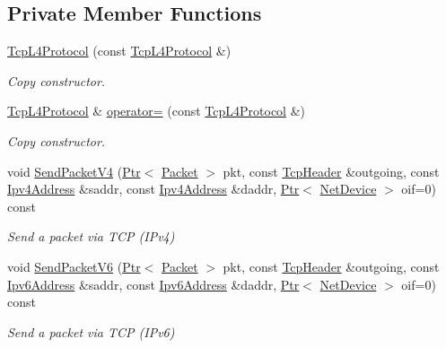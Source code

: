 \subsection*{Private Member Functions}
\begin{DoxyCompactItemize}
\item 
\hyperlink{classns3_1_1TcpL4Protocol_af48062ff2edb07fba859cfc9a863beaa}{Tcp\+L4\+Protocol} (const \hyperlink{classns3_1_1TcpL4Protocol}{Tcp\+L4\+Protocol} \&)
\begin{DoxyCompactList}\small\item\em Copy constructor. \end{DoxyCompactList}\item 
\hyperlink{classns3_1_1TcpL4Protocol}{Tcp\+L4\+Protocol} \& \hyperlink{classns3_1_1TcpL4Protocol_abe87d24c55bfbd6c6c2753725e239cca}{operator=} (const \hyperlink{classns3_1_1TcpL4Protocol}{Tcp\+L4\+Protocol} \&)
\begin{DoxyCompactList}\small\item\em Copy constructor. \end{DoxyCompactList}\item 
void \hyperlink{classns3_1_1TcpL4Protocol_ae57806dce4847383a27e329656e77e14}{Send\+Packet\+V4} (\hyperlink{classns3_1_1Ptr}{Ptr}$<$ \hyperlink{classns3_1_1Packet}{Packet} $>$ pkt, const \hyperlink{classns3_1_1TcpHeader}{Tcp\+Header} \&outgoing, const \hyperlink{classns3_1_1Ipv4Address}{Ipv4\+Address} \&saddr, const \hyperlink{classns3_1_1Ipv4Address}{Ipv4\+Address} \&daddr, \hyperlink{classns3_1_1Ptr}{Ptr}$<$ \hyperlink{classns3_1_1NetDevice}{Net\+Device} $>$ oif=0) const 
\begin{DoxyCompactList}\small\item\em Send a packet via T\+CP (I\+Pv4) \end{DoxyCompactList}\item 
void \hyperlink{classns3_1_1TcpL4Protocol_a12831eb88c02c37b3cf42cdda814cd19}{Send\+Packet\+V6} (\hyperlink{classns3_1_1Ptr}{Ptr}$<$ \hyperlink{classns3_1_1Packet}{Packet} $>$ pkt, const \hyperlink{classns3_1_1TcpHeader}{Tcp\+Header} \&outgoing, const \hyperlink{classns3_1_1Ipv6Address}{Ipv6\+Address} \&saddr, const \hyperlink{classns3_1_1Ipv6Address}{Ipv6\+Address} \&daddr, \hyperlink{classns3_1_1Ptr}{Ptr}$<$ \hyperlink{classns3_1_1NetDevice}{Net\+Device} $>$ oif=0) const 
\begin{DoxyCompactList}\small\item\em Send a packet via T\+CP (I\+Pv6) \end{DoxyCompactList}\end{DoxyCompactItemize}
